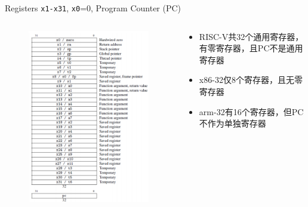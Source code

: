 \documentclass[UTF8]{ctexbeamer}
\begin{document}
\begin{frame}[fragile]{Registers}
\verb'x1-x31', \verb'x0'=0, Program Counter (PC)
\begin{columns}
\begin{column}{0.3\linewidth}
\begin{figure}
\centering
\includegraphics[width=\linewidth]{fig/Lecture2/general_registers.PNG}
\end{figure}
\end{column}
\begin{column}{0.6\linewidth}
\begin{itemize}
	\item RISC-V共32个通用寄存器，有零寄存器，且PC不是通用寄存器
	\item x86-32仅8个寄存器，且无零寄存器
	\item arm-32有16个寄存器，但PC不作为单独寄存器
\end{itemize}
\end{column}
\end{columns}
\end{frame}
\end{document}
